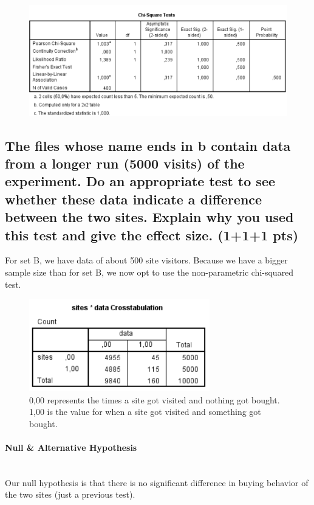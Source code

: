 \documentclass[14]{article}
\begin{document}
\newpage
\begin{figure}[!htb]
	\includegraphics[width=1.0\textwidth]{img/question2/Question2_Chi.PNG}
	\captionsetup{width=1.0\textwidth}
	\centering 
\end{figure}

\subsection{The files whose name ends in b contain data from a longer run (5000 visits) of the experiment. Do an appropriate test to see whether these data indicate a difference between the two sites. Explain why you used this test and give the effect size. (1+1+1 pts)}
For set B, we have data of about 500 site visitors. Because we have a bigger sample size than for set B, we now opt to use the non-parametric chi-squared test.

\begin{figure}[!htb]
	\includegraphics[width=0.7\textwidth]{img/question2/Question2_b.PNG}
	\captionsetup{width=0.8\textwidth}
	\centering 
	\caption{0,00 represents the times a site got visited and nothing got bought. 1,00 is the value for when a site got visited and something got bought.  } 
\end{figure}

\paragraph{Null \& Alternative Hypothesis}\mbox{}\\
Our null hypothesis is that there is no significant difference in buying behavior of the two sites (just a previous test).
\end{document}
